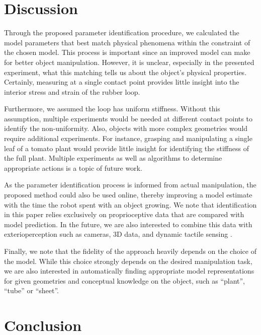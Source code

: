 \documentclass[letterpaper, 10pt, conference]{ieeeconf}
\begin{document}
\section{Discussion}
Through the proposed parameter identification procedure, we calculated the model parameters that best match physical phenomena within the constraint of the chosen model.  This process is important since an improved model can make for better object manipulation.  However, it is unclear, especially in the presented experiment, what this matching tells us about the object's physical properties.  Certainly, measuring at a single contact point provides little insight into the interior stress and strain of the rubber loop.

Furthermore, we assumed the loop has uniform stiffness.  Without this assumption, multiple experiments would be needed at different contact points to identify the non-uniformity.  Also, objects with more complex geometries would require additional experiments.  For instance, grasping and manipulating a single leaf of a tomato plant would provide little insight for identifying the stiffness of the full plant.  Multiple experiments as well as algorithms to determine appropriate actions is a topic of future work.

As the parameter identification process is informed from actual manipulation, the proposed method could also be used online, thereby improving a model estimate with the time the robot spent with an object growing. We note that identification in this paper relies exclusively on proprioceptive data that are compared with model prediction. In the future, we are also interested to combine this data with exterioperception such as cameras, 3D data, and dynamic tactile sensing \cite{hughes2014}. 

Finally, we note that the fidelity of the approach heavily depends on the choice of the model. While this choice strongly depends on the desired manipulation task, we are also interested in automatically finding appropriate model representations for given geometries and conceptual knowledge on the object, such as ``plant'', ``tube'' or ``sheet''.  

\section{Conclusion}








\end{document}
